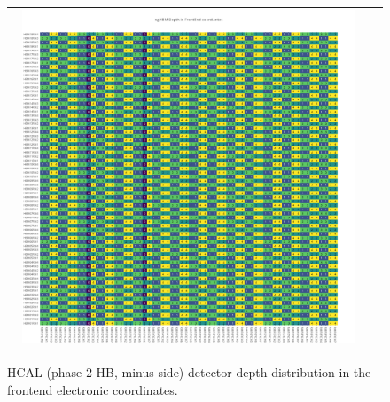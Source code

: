 \begin{figure}[htb]
 \begin{center}
  \begin{tabular}{cc}
   \includegraphics[angle=0,width=0.95\textwidth]{figures/appendix/ngHBM_Depth_in_FrontEnd.png}
  \end{tabular}
  \caption{HCAL (phase 2 HB, minus side) detector depth distribution in the frontend electronic coordinates.}
  \label{fig:lmapngHBMDepthFEC}
 \end{center}
\end{figure}
\clearpage


